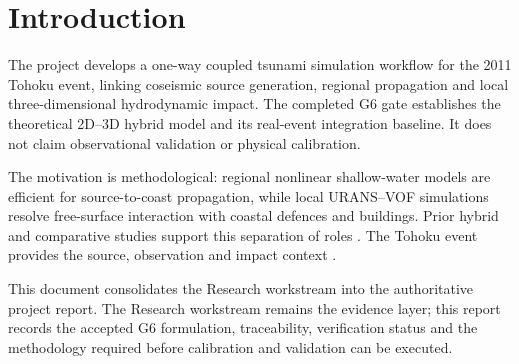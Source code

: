 \section{Introduction}

The project develops a one-way coupled tsunami simulation workflow for the 2011 Tohoku event, linking coseismic source generation, regional propagation and local three-dimensional hydrodynamic impact. The completed G6 gate establishes the theoretical 2D--3D hybrid model and its real-event integration baseline. It does not claim observational validation or physical calibration.

The motivation is methodological: regional nonlinear shallow-water models are efficient for source-to-coast propagation, while local URANS--VOF simulations resolve free-surface interaction with coastal defences and buildings. Prior hybrid and comparative studies support this separation of roles \autocite{fujima2002hybrid,takase2016hybrid,qin2018comparison}. The Tohoku event provides the source, observation and impact context \autocite{fujii2011tsunamisource,mori2012nationwide,fine2013japan}.

This document consolidates the Research workstream into the authoritative project report. The Research workstream remains the evidence layer; this report records the accepted G6 formulation, traceability, verification status and the methodology required before calibration and validation can be executed.
